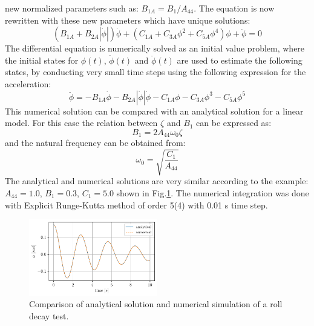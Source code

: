 new normalized parameters such as: $B_{1A} = B_1/A_{44}$. The equation
is now rewritten with these new parameters which have unique solutions:
\begin{equation}
\left(B_{1A} + B_{2A} \left|{\dot{\phi}}\right|\right) \dot{\phi} + \left(C_{1A} + C_{3A} \phi^{2} + C_{5A} \phi^{4}\right) \phi + \ddot{\phi} = 0
\label{eq:roll_decay_equation_quadratic_A}
\end{equation}
The differential equation is numerically solved as an initial value
problem, where the initial states for $\phi(t)$, $\dot{\phi}(t)$ and
$\ddot{\phi}(t)$ are used to estimate the following states, by
conducting very small time steps using the following expression for the
acceleration:
\begin{equation}
\ddot{\phi} = - B_{1A} \dot{\phi} - B_{2A} \left|{\dot{\phi}}\right| \dot{\phi} - C_{1A} \phi - C_{3A} \phi^{3} - C_{5A} \phi^{5}
\label{eq:eq_phi1d}
\end{equation}
This numerical solution can be compared with an analytical solution for
a linear model.  For this case the relation between $\zeta$ and $B_1$ can
be expressed as:
\begin{equation}
B_{1} = 2 A_{44} \omega_{0} \zeta
\label{eq:B_1_zeta_eq}
\end{equation}
and the natural frequency can be obtained from:
\begin{equation}
\omega_{0} = \sqrt{\frac{C_{1}}{A_{44}}}
\label{eq:omega0_eq}
\end{equation}
The analytical and numerical solutions are very similar according to the
example: $A_{44} = 1.0$, $B_1 = 0.3$, $C_1 = 5.0$ shown in
Fig.\ref{fig:analytical_numerical}. The numerical integration
was done with Explicit Runge-Kutta method of order 5(4) with 0.01 s time
step.
\begin{figure}[H]
\begin{center}\includegraphics[width = 0.5\textwidth]{figures/analytical_numerical.pdf}\end{center}
\vspace{-1cm}
\caption{Comparison of analytical solution and numerical simulation of a roll decay test.}
\label{fig:analytical_numerical}
\end{figure}
